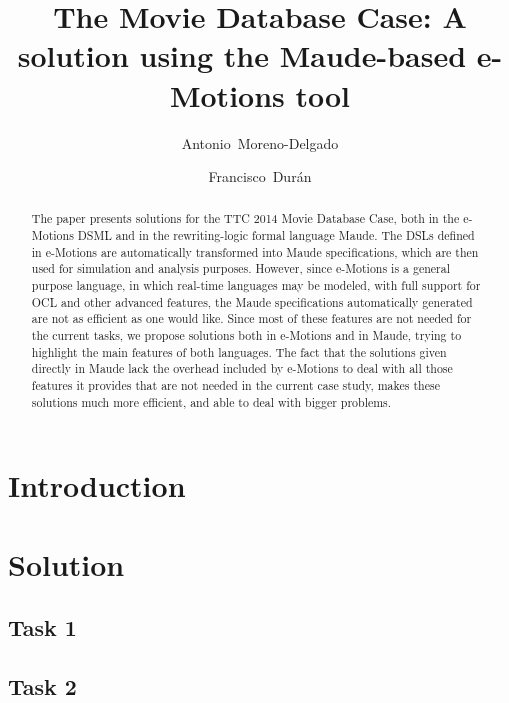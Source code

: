 \documentclass[draft]{llncs}
\title{The Movie Database Case: A solution using the Maude-based e-Motions tool}
\author{Antonio~Moreno-Delgado \and Francisco~Dur\'an}
\institute{
    University of M\'alaga\\
    \email{\{amoreno,duran\}@lcc.uma.es}
    }
\begin{document}
\maketitle

\begin{abstract}
The paper presents solutions for the TTC 2014 Movie Database Case, both in the e-Motions DSML and in the rewriting-logic formal language Maude. The DSLs defined in e-Motions are automatically transformed into Maude specifications, which are then used for simulation and analysis purposes. However, since e-Motions is a general purpose language, in which real-time languages may be modeled, with full support for OCL and other advanced features, the Maude specifications automatically generated are not as efficient as one would like. Since most of these features are not needed for the current tasks, we propose solutions both in e-Motions and in Maude, trying to highlight the main features of both languages. The fact that the solutions given directly in Maude lack the overhead included by e-Motions to deal with all those features it provides that are not needed in the current case study, makes these solutions much more efficient, and able to deal with bigger problems. 
\end{abstract}

\section{Introduction}
\label{sec:intro}


\section{Solution}
\label{sec:solution}


\subsection{Task 1}
\label{sub:task1}


\subsection{Task 2}
\label{sub:task2}

\end{document}
